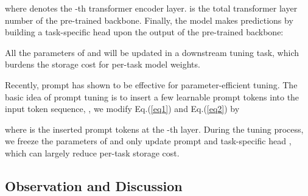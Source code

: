 \documentclass[10pt,twocolumn,letterpaper]{article}
\begin{document}
where  denotes the -th transformer encoder layer.  is the total transformer layer number of the pre-trained backbone.
Finally, the model makes predictions by building a task-specific head  upon the output of the pre-trained backbone: 

All the parameters of  and  will be updated in a downstream tuning task, which burdens the storage cost for per-task model weights.

Recently, prompt \cite{zhou2022learning, jia2022visual} has shown to be effective for parameter-efficient tuning. 
The basic idea of prompt tuning is to insert a few learnable prompt tokens into the input token sequence, \ie, we modify Eq.(\ref{eq1}) and Eq.(\ref{eq2}) by

where  is the inserted prompt tokens at the -th layer. 
During the tuning process, we freeze the parameters of  and only update prompt  and task-specific head , which can largely reduce per-task storage cost. 

\subsection{Observation and Discussion}
\label{subsec:obs}

\begin{table}[htbp]
  \centering
  \caption{Classification accuracy (\%) for different tuning strategies is reported. All experiments were conducted based on a pre-trained Point-MAE \cite{pang2022masked} model, and a simple rotation augmentation in ACT \cite{dong2022autoencoders} was employed on the ScanObjectNN \cite{uy2019revisiting} dataset. '\#TP' denotes the number of trainable parameters.
  }
  \label{table_obs}\end{table}
\end{document}
